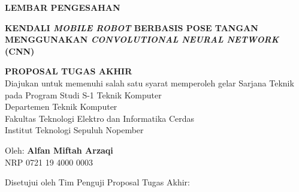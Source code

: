 \begin{center}
	\large
  \textbf{LEMBAR PENGESAHAN}
\end{center}

\thispagestyle{empty}

\begin{center}
  \textbf{KENDALI \textit{MOBILE ROBOT} BERBASIS POSE TANGAN MENGGUNAKAN \textit{CONVOLUTIONAL NEURAL NETWORK} (CNN)}
\end{center}

\begingroup
  \small

  \begin{center}
    \textbf{PROPOSAL TUGAS AKHIR} \\
    Diajukan untuk memenuhi salah satu syarat memperoleh gelar
    Sarjana Teknik pada 
    Program Studi S-1 Teknik Komputer \\
    Departemen Teknik Komputer \\
    Fakultas Teknologi Elektro dan Informatika Cerdas  \\
    Institut Teknologi Sepuluh Nopember
  \end{center}

  \begin{center}
    Oleh: \textbf{Alfan Miftah Arzaqi} \\
    NRP 0721 19 4000 0003
  \end{center}

  \begin{center}
    Disetujui oleh Tim Penguji Proposal Tugas Akhir:
  \end{center}

  \begingroup
    \setlength{\tabcolsep}{0pt}

